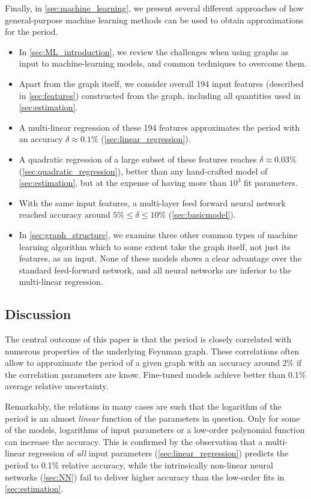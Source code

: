 \documentclass[11pt]{scrartcl}
\numberwithin{equation}{section}
\begin{document}
\medskip 
\noindent
Finally, in \cref{sec:machine_learning}, we present several different approaches of how general-purpose machine learning methods can be used to obtain  approximations for the period. 

\begin{itemize}
	\item In \cref{sec:ML_introduction}, we review the challenges when using graphs as input to machine-learning models, and common techniques to overcome them. 
	\item Apart from the graph itself, we consider overall  194 input features (described in \cref{sec:features}) constructed from the graph, including all quantities used in \cref{sec:estimation}.
	\item A multi-linear regression of these 194 features approximates the period with an accuracy $\delta \approx 0.1\%$ (\cref{sec:linear_regression}).
	\item A quadratic regression of a large subset of these features reaches $\delta \approx 0.03\%$ (\cref{sec:quadratic_regression}), better than any hand-crafted model of \cref{sec:estimation}, but at the expense of having more than $10^3$ fit parameters.
	\item With the same input features, a multi-layer feed forward neural network reached accuracy around $5\% \leq \delta \leq 10\%$ (\cref{sec:basicmodel}).
	\item In \cref{sec:graph_structure}, we examine three other common types of machine learning algorithm which to some extent take the graph itself, not just its features, as an input. None of these models shows a clear advantage over the standard feed-forward network, and all neural networks are inferior to the multi-linear regression.
\end{itemize}

	


\subsection{Discussion}\label{sec:discussion}

The central outcome of this paper is that the period is closely correlated with numerous properties of the underlying Feynman graph. These correlations often allow to approximate the period of a given graph with an accuracy around 2\% if the correlation parameters are know. Fine-tuned models achieve better than 0.1\% average relative uncertainty. 

Remarkably, the relations in many cases are such that the logarithm of the period is an  almost  \emph{linear} function of the parameters in question.  Only for some of the models,   logarithms of input parameters or a low-order polynomial function can increase the accuracy.  This is confirmed by the observation that a multi-linear regression of \emph{all} input parameters (\cref{sec:linear_regression})  predicts the period to 0.1\% relative accuracy, while the intrinsically non-linear neural networks (\cref{sec:NN}) fail to deliver higher accuracy than the low-order fits in \cref{sec:estimation}.
\end{document}
